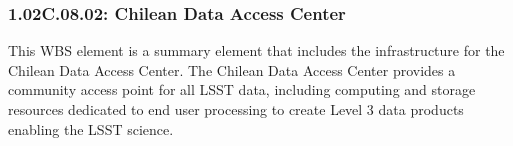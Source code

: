 \subsubsection{1.02C.08.02: Chilean Data Access Center}

This WBS element is a summary element that includes the infrastructure for the
Chilean Data Access Center. The Chilean Data Access Center provides a
community access point for all LSST data, including computing and storage
resources dedicated to end user processing to create Level 3 data products
enabling the LSST science.
